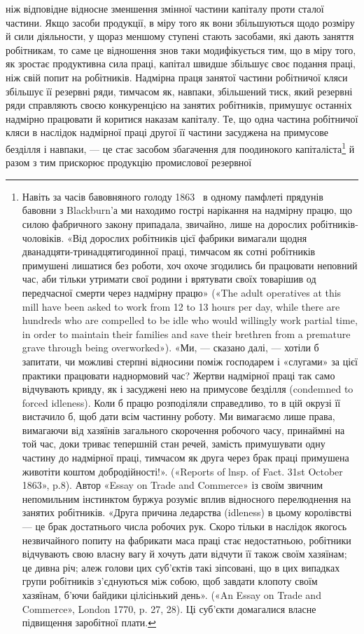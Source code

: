 \parcont{}  %
ніж відповідне відносне зменшення змінної частини капіталу
проти сталої частини. Якщо засоби продукції, в міру того як
вони збільшуються щодо розміру й сили діяльности, у щораз
меншому ступені стають засобами, які дають заняття робітникам,
то саме це відношення знов таки модифікується тим, що в міру
того, як зростає продуктивна сила праці, капітал швидше збільшує
своє подання праці, ніж свій попит на робітників. Надмірна
праця занятої частини робітничої кляси збільшує її резервні
ряди, тимчасом як, навпаки, збільшений тиск, який резервні
ряди справляють своєю конкуренцією на занятих робітників,
примушує останніх надмірно працювати й коритися наказам
капіталу. Те, що одна частина робітничої кляси в наслідок надмірної
праці другої її частини засуджена на примусове безділля
і навпаки, — це стає засобом збагачення для поодинокого капіталіста\footnote{
Навіть за часів бавовняного голоду 1863~ в одному памфлеті
прядунів бавовни з Blackburn’а ми находимо гострі нарікання на надмірну
працю, що силою фабричного закону припадала, звичайно, лише
на дорослих робітників-чоловіків. «Від дорослих робітників цієї фабрики
вимагали щодня дванадцяти-тринадцятигодинної праці, тимчасом
як сотні робітників примушені лишатися без роботи, хоч охоче згодились
би працювати неповний час, аби тільки утримати свої родини і врятувати
своїх товарішив од передчасної смерти через надмірну працю» («The
adult operatives at this mill have been asked to work from 12 to 13 hours
per day, while there are hundreds who are compelled to be idle who would
willingly work partial time, in order to maintain their families and save
their brethren from a premature grave through being overworked»). «Ми, —
сказано далі, — хотіли б запитати, чи можливі стерпні відносини поміж
господарем і «слугами» за цієї практики працювати наднормовий час?
Жертви надмірної праці так само відчувають кривду, як і засуджені
нею на примусове безділля (condemned to forced idleness). Коли б працю
розподіляли справедливо, то в цій окрузі її вистачило б, щоб дати всім
частинну роботу. Ми вимагаємо лише права, вимагаючи від хазяїнів загального
скорочення робочого часу, принаймні на той час, доки триває
тепершній стан речей, замість примушувати одну частину до надмірної
праці, тимчасом як друга через брак праці примушена животіти коштом
добродійності!». («Reports of lnsp. of Fact. 31st October 1863», p.8).
Автор «Essay on Trade and Commerce» із своїм звичним непомильним
інстинктом буржуа розуміє вплив відносного перелюднення на занятих
робітників. «Друга причина ледарства (idleness) в цьому королівстві —
це брак достатнього числа робочих рук. Скоро тільки в наслідок якогось
незвичайного попиту на фабрикати маса праці стає недостатньою, робітники
відчувають свою власну вагу й хочуть дати відчути її також своїм
хазяїнам; це дивна річ; алеж голови цих суб’єктів такі зіпсовані, що в цих
випадках групи робітників з’єднуються між собою, щоб завдати клопоту
своїм хазяїнам, б’ючи байдики цілісінький день». («An Essay on Trade
and Commerce», London 1770, p. 27, 28). Ці суб’єкти домагалися власне
підвищення заробітної плати.
} й разом з тим прискорює продукцію промислової резервної

